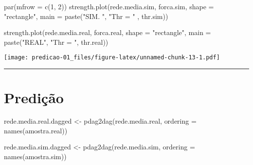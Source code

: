 \documentclass[
]{article}
\newenvironment{Shaded}{\begin{snugshade}}{\end{snugshade}}
\newcommand{\AttributeTok}[1]{\textcolor[rgb]{0.77,0.63,0.00}{#1}}
\newcommand{\DecValTok}[1]{\textcolor[rgb]{0.00,0.00,0.81}{#1}}
\newcommand{\FunctionTok}[1]{\textcolor[rgb]{0.00,0.00,0.00}{#1}}
\newcommand{\NormalTok}[1]{#1}
\newcommand{\OtherTok}[1]{\textcolor[rgb]{0.56,0.35,0.01}{#1}}
\newcommand{\StringTok}[1]{\textcolor[rgb]{0.31,0.60,0.02}{#1}}
\begin{document}
\begin{Shaded}
\begin{Highlighting}[]
\FunctionTok{par}\NormalTok{(}\AttributeTok{mfrow =} \FunctionTok{c}\NormalTok{(}\DecValTok{1}\NormalTok{, }\DecValTok{2}\NormalTok{))}
\FunctionTok{strength.plot}\NormalTok{(rede.media.sim, }
\NormalTok{              forca.sim, }
              \AttributeTok{shape =} \StringTok{"rectangle"}\NormalTok{, }
              \AttributeTok{main =} \FunctionTok{paste}\NormalTok{(}\StringTok{"SIM. "}\NormalTok{, }\StringTok{"Thr = "}\NormalTok{ , thr.sim))}



\FunctionTok{strength.plot}\NormalTok{(rede.media.real, }
\NormalTok{              forca.real, }
              \AttributeTok{shape =} \StringTok{"rectangle"}\NormalTok{, }
              \AttributeTok{main =} \FunctionTok{paste}\NormalTok{(}\StringTok{"REAL"}\NormalTok{, }\StringTok{"Thr = "}\NormalTok{, thr.real))}
\end{Highlighting}
\end{Shaded}

\texttt{[image: predicao-01\_files/figure-latex/unnamed-chunk-13-1.pdf]}

\begin{center}\rule{0.5\linewidth}{0.5pt}\end{center}

\hypertarget{prediuxe7uxe3o-1}{%
\section{Predição}\label{prediuxe7uxe3o-1}}

\begin{Shaded}
\begin{Highlighting}[]
\NormalTok{rede.media.real.dagged }\OtherTok{\textless{}{-}} \FunctionTok{pdag2dag}\NormalTok{(rede.media.real, }
                                   \AttributeTok{ordering =} \FunctionTok{names}\NormalTok{(amostra.real))}

\NormalTok{rede.media.sim.dagged }\OtherTok{\textless{}{-}} \FunctionTok{pdag2dag}\NormalTok{(rede.media.sim, }
                                  \AttributeTok{ordering =} \FunctionTok{names}\NormalTok{(amostra.sim))}
\end{Highlighting}
\end{Shaded}
\end{document}
